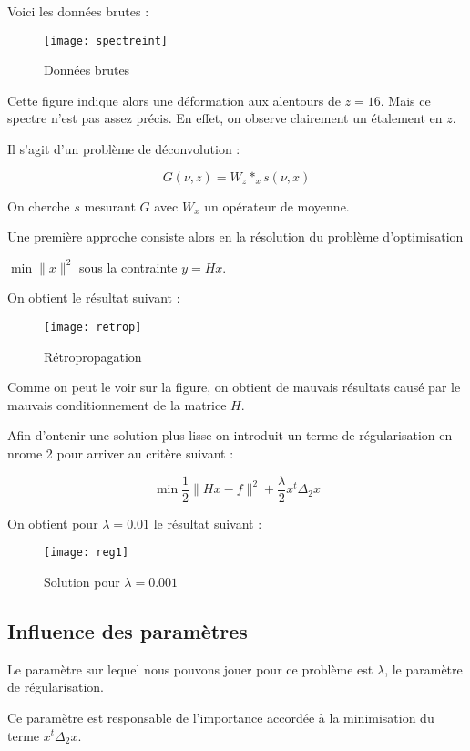 \documentclass[12pt,a4paper,titlepage]{scrartcl}
\begin{document}
Voici les données brutes :

\begin{figure}[H]
    \caption{Données brutes}
    \texttt{[image: spectreint]}
    \centering
\end{figure}

Cette figure indique alors une déformation aux alentours de $z = 16$. Mais ce spectre n'est
pas assez précis. En effet, on observe clairement un étalement en $z$.

Il s'agit d'un problème de déconvolution :

$$ G(\nu, z) = W_z *_x s(\nu,x) $$

On cherche $s$ mesurant $G$ avec $W_x$ un opérateur de moyenne.

Une première approche consiste alors en la résolution du problème d'optimisation

$\min \lVert x \rVert^2$ sous la contrainte $y = Hx$.

On obtient le résultat suivant :

\begin{figure}[H]
    \caption{Rétropropagation}
    \texttt{[image: retrop]}
    \centering
\end{figure}

Comme on peut le voir sur la figure, on obtient de mauvais résultats causé par le mauvais
conditionnement de la matrice $H$.

Afin d'ontenir une solution plus lisse on introduit un terme de régularisation en nrome 2
pour arriver au critère suivant :

$$ \min \frac{1}{2} \lVert Hx - f \rVert^2 + \frac{\lambda}{2} x^t \Delta_2 x$$

On obtient pour $\lambda = 0.01$ le résultat suivant :

\begin{figure}[H]
    \caption{Solution pour $\lambda = 0.001$}
    \texttt{[image: reg1]}
    \centering
\end{figure}

\subsection{Influence des paramètres}

Le paramètre sur lequel nous pouvons jouer pour ce problème est $\lambda$, le paramètre
de régularisation.

Ce paramètre est responsable de l'importance accordée à la minimisation du terme
$x^t \Delta_2 x$.
\end{document}
